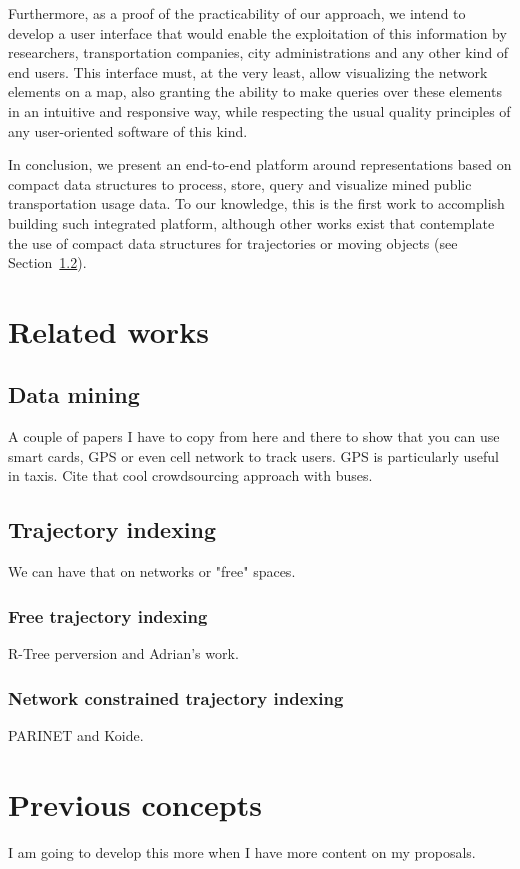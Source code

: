 \documentclass{UniVieCS_PhD} %
\begin{document}
	Furthermore, as a proof of the practicability of our approach, we intend to develop a user interface that would enable the exploitation of this information by researchers, transportation companies, city administrations and any other kind of end users. This interface must, at the very least, allow visualizing the network elements on a map, also granting the ability to make queries over these elements in an intuitive and responsive way, while respecting the usual quality principles of any user-oriented software of this kind.
	
	In conclusion, we present an end-to-end platform around representations based on compact data structures to process, store, query and visualize mined public transportation usage data. To our knowledge, this is the first work to accomplish building such integrated platform, although other works exist that contemplate the use of compact data structures for trajectories or moving objects (see Section~\ref{sec:ti}).
	
	\section{Related works}
	\subsection{Data mining}
	A couple of papers I have to copy from here and there to show that you can use smart cards, GPS or even cell network to track users. GPS is particularly useful in taxis. Cite that cool crowdsourcing approach with buses.
	
	\subsection{Trajectory indexing}
	\label{sec:ti}
	We can have that on networks or "free" spaces.
	
	\subsubsection{Free trajectory indexing}
	R-Tree perversion and Adrian's work.
	
	\subsubsection{Network constrained trajectory indexing}
	PARINET and Koide.
	
	\section{Previous concepts}
	I am going to develop this more when I have more content on my proposals.
	
\end{document}
